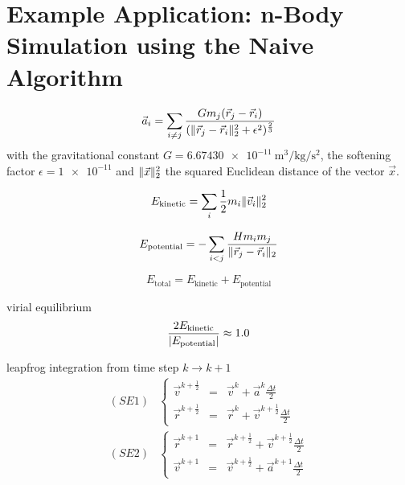 \section{Example Application: n-Body Simulation using the Naive Algorithm}

\cite{thuring_comparing_2023}

\begin{equation}\label{eq:acceleration}
    \Vec{a}_i = \sum\limits_{i \neq j} \frac{G m_j (\Vec{r}_j - \Vec{r}_i)}{(\lVert\Vec{r}_j - \Vec{r}_i\rVert^2_2 + \epsilon^2)^\frac{2}{3}}
\end{equation}
with the gravitational constant $G = \SI{6.67430e-11}{\meter\cubed\per\kilo\gram\per\second\squared}$, the softening factor $\epsilon = \num{1e-11}$ and $\lVert\Vec{x}\rVert^2_2$ the squared Euclidean distance of the vector $\Vec{x}$.

\begin{equation}\label{eq:kinetic_energy}
    E_{\text{kinetic}} = \sum\limits_i \frac{1}{2} m_i \lVert\Vec{v}_i\rVert^2_2
\end{equation}

\begin{equation}\label{eq:potential_energy}
    E_{\text{potential}} = -\sum\limits_{i < j} \frac{H m_i m_j}{\lVert\Vec{r}_j - \Vec{r}_i\rVert_2}
\end{equation}

\begin{equation}\label{eq:total_energy}
    E_{\text{total}} = E_{\text{kinetic}} + E_{\text{potential}}
\end{equation}

virial equilibrium
\begin{equation}\label{eq:virial_equilibrium}
    \frac{2E_{\text{kinetic}}}{\lvert E_{\text{potential}}\rvert} \approx \num{1.0}
\end{equation}

leapfrog integration from time step $k \rightarrow k + 1$
\begin{equation}\label{eq:leapfrog}
    \begin{split}
      (SE1) &\left\lbrace
      \begin{array}{rcl}
        \vec{v}^{k+\frac{1}{2}} & = & \vec{v}^k + \vec{a}^k \frac{\Delta t}{2}               \\
        \vec{r}^{k+\frac{1}{2}} & = & \vec{r}^k + \vec{v}^{k + \frac{1}{2}} \frac{\Delta t}{2}
      \end{array}\right.\\[.5em]
      (SE2) &\left\lbrace
      \begin{array}{rcl}
        \vec{r}^{k+1} & = & \vec{r}^{k + \frac{1}{2}} + \vec{v}^{k + \frac{1}{2}} \frac{\Delta t}{2} \\
        \vec{v}^{k+1} & = & \vec{v}^{k + \frac{1}{2}} + \vec{a}^{k+1} \frac{\Delta t}{2}
      \end{array}\right.\\
    \end{split}
\end{equation}


